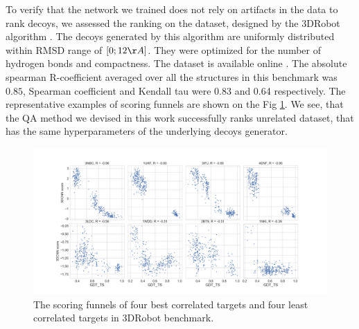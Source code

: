 To verify that the network we trained does not rely on artifacts in the data to rank decoys, we assessed the ranking on the dataset, designed 
by the 3DRobot algorithm \cite{deng20163drobot}. The decoys generated by this algorithm are 
uniformly distributed within RMSD range of $[0; 12\AA]$. They 
were optimized for the number of hydrogen bonds and compactness. The dataset is available online \cite{3DRobotDS}.
The absolute spearman R-coefficient averaged over all the structures in this benchmark was $0.85$, Spearman coefficient and Kendall tau were
0.83 and 0.64 respectively. The representative examples of scoring funnels are shown on the Fig \ref{Fig:3DRobotBenchmark}. 
We see, that the QA method we devised
in this work successfully ranks unrelated dataset, that has the same hyperparameters of the underlying decoys generator.

\begin{figure}[H]
    \centering
    \includegraphics[width=\linewidth]{Fig/3DRobot_set_sFinal_funnels.png}
    \caption{The scoring funnels of four best correlated targets and four least correlated targets in 3DRobot benchmark.}
    \label{Fig:3DRobotBenchmark}
\end{figure}